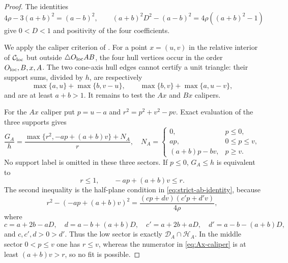 \begin{proof}
The identities
\[
 4\rho-3(a+b)^2=(a-b)^2,
 \qquad
 (a+b)^2D^2-(a-b)^2=4\rho((a+b)^2-1)
\]
give $0<D<1$ and positivity of the four coefficients.

We apply the caliper criterion of .  For a
point $x=(u,v)$ in the relative interior of $\mathcal C_{\rm loc}$ but outside
$\triangle O_{\rm loc}AB$, the four hull vertices occur in the order $O_{\rm loc},B,x,A$.
The two cone-axis hull edges cannot certify a unit triangle: their support
sums, divided by $h$, are respectively
\[
 \max\{a,u\}+\max\{b,v-u\},\qquad
 \max\{b,v\}+\max\{a,u-v\},
\]
and are at least $a+b>1$.  It remains to test the $Ax$ and $Bx$ calipers.

For the $Ax$ caliper put $p=u-a$ and
$r^2=p^2+v^2-pv$.  Exact evaluation of the three supports gives
\begin{equation}
 \frac{G_A}{h}=
 \frac{\max\{r^2,-ap+(a+b)v\}+N_A}{r},
 \quad
 N_A=\begin{cases}
 0,&p\le0,\\
 ap,&0\le p\le v,\\
 (a+b)p-bv,&p\ge v.
 \end{cases}                                      \label{eq:Ax-caliper}
\end{equation}
No support label is omitted in these three sectors.  If $p\le0$,
$G_A\le h$ is equivalent to
\[
 r\le1,\qquad -ap+(a+b)v\le r.
\]
The second inequality is the half-plane condition in
\eqref{eq:strict-ab-identity}, because
\[
 r^2-(-ap+(a+b)v)^2
 =\frac{(cp+dv)(c'p+d'v)}{4\rho},
\]
where
\[
 c=a+2b-aD,\quad d=a-b+(a+b)D,
 \quad c'=a+2b+aD,\quad d'=a-b-(a+b)D,
\]
and $c,c',d>0>d'$.  Thus the low sector is exactly
$\mathcal D_A\cap\mathcal H_A$.  In the middle sector $0<p\le v$ one has
$r\le v$, whereas the numerator in \eqref{eq:Ax-caliper} is at least
$(a+b)v>r$, so no fit is possible.


\end{proof}
